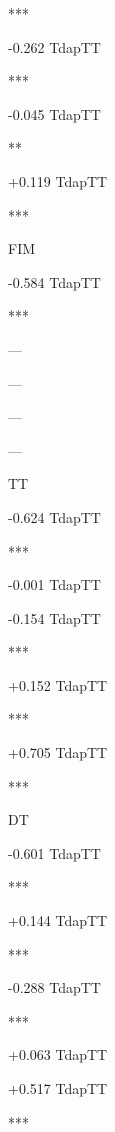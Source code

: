 \documentclass[
]{article}
\begin{document}
***

{-0.262} {{Tdap}{TT}}

{}{}

{}{}

***

{-0.045} {{Tdap}{TT}}

{}{}

{}{}

**

{+0.119} {{Tdap}{TT}}

{}{}

{}{}

***

FIM

{-0.584} {{Tdap}{TT}}

{}{}

{}{}

***

---

---

---

---

TT

{-0.624} {{Tdap}{TT}}

{}{}

{}{}

***

{-0.001} {{Tdap}{TT}}

{}{}

{}{}

{}

{-0.154} {{Tdap}{TT}}

{}{}

{}{}

***

{+0.152} {{Tdap}{TT}}

{}{}

{}{}

***

{+0.705} {{Tdap}{TT}}

{}{}

{}{}

***

DT

{-0.601} {{Tdap}{TT}}

{}{}

{}{}

***

{+0.144} {{Tdap}{TT}}

{}{}

{}{}

***

{-0.288} {{Tdap}{TT}}

{}{}

{}{}

***

{+0.063} {{Tdap}{TT}}

{}{}

{}{}

{}

{+0.517} {{Tdap}{TT}}

{}{}

{}{}

***
\end{document}
